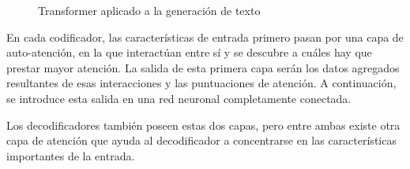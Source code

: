 \begin{figure}[H]
\centering
    \caption{Transformer aplicado a la generación de texto \cite{transformers}}
\end{figure}

En cada codificador, las características de entrada primero pasan por una capa de auto-atención, en la que interactúan entre sí y se descubre a cuáles hay que prestar mayor atención. La salida de esta primera capa serán los datos agregados resultantes de esas interacciones y las puntuaciones de atención. A continuación, se introduce esta salida en una red neuronal completamente conectada. \cite{self-attention}

Los decodificadores también poseen estas dos capas, pero entre ambas existe otra capa de atención que ayuda al decodificador a concentrarse en las características importantes de la entrada.

